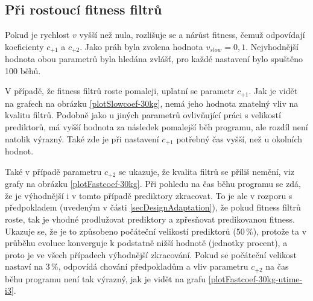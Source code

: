 \subsection*{Při rostoucí fitness filtrů}

Pokud je rychlost $v$ vyšší než nula, rozlišuje se  a  nárůst fitness, čemuž odpovídají koeficienty $c_{+1}$ a $c_{+2}$. Jako práh byla zvolena hodnota $v_\mathit{slow} = 0,1$. Nejvhodnější hodnota obou parametrů byla hledána zvlášť, pro každé nastavení bylo spuštěno 100 běhů.

V případě, že fitness filtrů roste pomaleji, uplatní se parametr $c_{+1}$. Jak je vidět na grafech na obrázku \ref{plotSlowcoef-30kg}, nemá jeho hodnota znatelný vliv na kvalitu filtrů. Podobně jako u jiných parametrů ovlivňující práci s velikostí prediktorů, má vyšší hodnota za následek pomalejší běh programu, ale rozdíl není natolik výrazný. Také zde je při nastavení $c_{+1}$ potřebný čas vyšší, než u okolních hodnot.

Také v případě parametru $c_{+2}$ se ukazuje, že kvalita filtrů se příliš nemění, viz grafy na obrázku \ref{plotFastcoef-30kg}. Při pohledu na čas běhu programu se zdá, že je výhodnější i v tomto případě prediktory zkracovat. To je ale v rozporu s předpokladem (uvedeným v části \ref{secDesignAdaptation}), že pokud fitness filtrů roste, tak je vhodné prodlužovat prediktory a zpřesňovat predikovanou fitness. Ukazuje se, že je to způsobeno počáteční velikostí prediktorů (50\,\%), protože ta v průběhu evoluce konverguje k podstatně nižší hodnotě (jednotky procent), a proto je ve všech případech výhodnější zkracování. Pokud se počáteční velikost nastaví na 3\,\%, odpovídá chování předpokladům a vliv parametru $c_{+2}$ na čas běhu programu není tak výrazný, jak je vidět na grafu \ref{plotFastcoef-30kg-utime-i3}.

